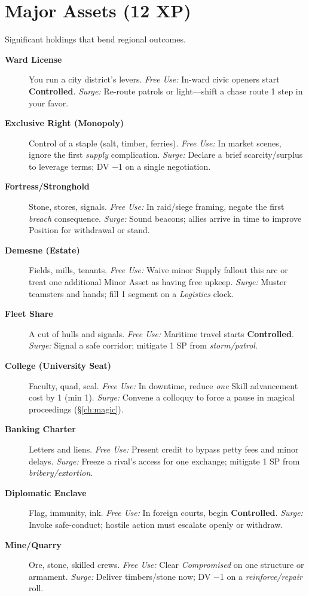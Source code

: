 \section{Major Assets (12 XP)}
Significant holdings that bend regional outcomes.
\begin{description}
  \item[\textbf{Ward License}]  You run a city district’s levers. \emph{Free Use:} In-ward civic openers start \textbf{Controlled}. \emph{Surge:} Re-route patrols or light—shift a chase route 1 step in your favor.
  \item[\textbf{Exclusive Right (Monopoly)}]  Control of a staple (salt, timber, ferries). \emph{Free Use:} In market scenes, ignore the first \emph{supply} complication. \emph{Surge:} Declare a brief scarcity/surplus to leverage terms; DV −1 on a single negotiation.
  \item[\textbf{Fortress/Stronghold}]  Stone, stores, signals. \emph{Free Use:} In raid/siege framing, negate the first \emph{breach} consequence. \emph{Surge:} Sound beacons; allies arrive in time to improve Position for withdrawal or stand.
  \item[\textbf{Demesne (Estate)}]  Fields, mills, tenants. \emph{Free Use:} Waive minor Supply fallout this arc or treat one additional Minor Asset as having free upkeep. \emph{Surge:} Muster teamsters and hands; fill 1 segment on a \emph{Logistics} clock.
  \item[\textbf{Fleet Share}]  A cut of hulls and signals. \emph{Free Use:} Maritime travel starts \textbf{Controlled}. \emph{Surge:} Signal a safe corridor; mitigate 1 SP from \emph{storm/patrol}.
  \item[\textbf{College (University Seat)}]  Faculty, quad, seal. \emph{Free Use:} In downtime, reduce \emph{one} Skill advancement cost by 1 (min 1). \emph{Surge:} Convene a colloquy to force a pause in magical proceedings (\S\ref{ch:magic}).
  \item[\textbf{Banking Charter}]  Letters and liens. \emph{Free Use:} Present credit to bypass petty fees and minor delays. \emph{Surge:} Freeze a rival’s access for one exchange; mitigate 1 SP from \emph{bribery/extortion}.
  \item[\textbf{Diplomatic Enclave}]  Flag, immunity, ink. \emph{Free Use:} In foreign courts, begin \textbf{Controlled}. \emph{Surge:} Invoke safe-conduct; hostile action must escalate openly or withdraw.
  \item[\textbf{Mine/Quarry}]  Ore, stone, skilled crews. \emph{Free Use:} Clear \emph{Compromised} on one structure or armament. \emph{Surge:} Deliver timbers/stone now; DV −1 on a \emph{reinforce/repair} roll.
\end{description}

